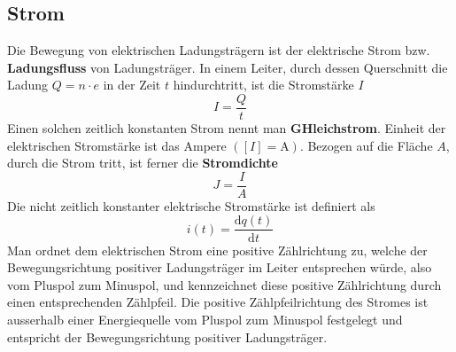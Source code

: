 \subsection{Strom}
Die Bewegung von elektrischen Ladungsträgern ist der elektrische Strom bzw. \textbf{Ladungsfluss} von Ladungsträger. In einem Leiter, durch dessen Querschnitt die Ladung $Q=n\cdot e$ in der Zeit $t$ hindurchtritt, ist die Stromstärke $I$
\begin{equation}
\boxed{I=\dfrac{Q}{t}}
\end{equation}
Einen solchen zeitlich konstanten Strom nennt man \textbf{GHleichstrom}. Einheit der elektrischen Stromstärke ist das Ampere $([I]=\text{A})$. Bezogen auf die Fläche $A$, durch die Strom tritt, ist ferner die \textbf{Stromdichte}
\begin{equation}
\boxed{J=\dfrac{I}{A}}
\end{equation}
Die nicht zeitlich konstanter elektrische Stromstärke ist definiert als
\begin{equation}
\boxed{i\left(t\right)=\dfrac{\text{d}q\left(t\right)}{\text{d}t}}
\end{equation}
Man ordnet dem elektrischen Strom eine positive Zählrichtung zu, welche der Bewegungsrichtung positiver Ladungsträger im Leiter entsprechen würde, also vom Pluspol zum Minuspol, und kennzeichnet diese positive Zählrichtung durch einen entsprechenden Zählpfeil.
\newline\newline
Die positive Zählpfeilrichtung des Stromes ist ausserhalb einer Energiequelle vom Pluspol zum Minuspol festgelegt und entspricht der Bewegungsrichtung positiver Ladungsträger.
